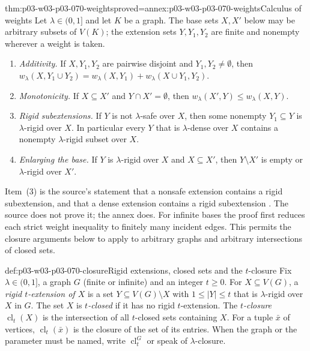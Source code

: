 \begin{hblemma}{thm:p03-w03-p03-070-weights}{proved=annex:p03-w03-p03-070-weights}{Calculus of weights}
Let \(\lambda\in(0,1]\) and let \(K\) be a graph.  The base sets \(X,X'\)
below may be arbitrary subsets of \(V(K)\); the extension sets
\(Y,Y_1,Y_2\) are finite and nonempty wherever a weight is taken.
\begin{enumerate}
\item \emph{Additivity.}  If \(X,Y_1,Y_2\) are pairwise disjoint and
      \(Y_1,Y_2\neq\emptyset\), then
      \(w_\lambda(X,Y_1\cup Y_2)=w_\lambda(X,Y_1)+w_\lambda(X\cup Y_1,Y_2)\).
\item \emph{Monotonicity.}  If \(X\subseteq X'\) and \(Y\cap X'=\emptyset\),
      then \(w_\lambda(X',Y)\leq w_\lambda(X,Y)\).
\item \emph{Rigid subextensions.}  If \(Y\) is not \(\lambda\)-safe over
      \(X\), then some nonempty \(Y_1\subseteq Y\) is \(\lambda\)-rigid over
      \(X\).  In particular every \(Y\) that is \(\lambda\)-dense over \(X\)
      contains a nonempty \(\lambda\)-rigid subset over \(X\).
\item \emph{Enlarging the base.}  If \(Y\) is \(\lambda\)-rigid over \(X\) and
      \(X\subseteq X'\), then \(Y\setminus X'\) is empty or
      \(\lambda\)-rigid over \(X'\).
\end{enumerate}
\end{hblemma}

Item~(3) is the source's statement that a nonsafe extension contains a rigid
subextension, and that a dense extension contains a rigid subextension
\cite[pp.~12 and 21]{Spencer2007LogicRandomStructuresAuthor}.  The source
does not prove it; the annex does.  For infinite bases the proof first
reduces each strict weight inequality to finitely many incident edges.
This permits the closure arguments below to apply to arbitrary graphs and
arbitrary intersections of closed sets.

\begin{hbdefinition}{def:p03-w03-p03-070-closure}{Rigid extensions, closed sets and the \(t\)-closure}
Fix \(\lambda\in(0,1]\), a graph \(G\) (finite or infinite) and an integer
\(t\geq0\).  For \(X\subseteq V(G)\), a \emph{rigid \(t\)-extension of
\(X\)} is a set \(Y\subseteq V(G)\setminus X\) with \(1\leq|Y|\leq t\) that
is \(\lambda\)-rigid over \(X\) in \(G\).  The set \(X\) is
\emph{\(t\)-closed} if it has no rigid \(t\)-extension.  The
\emph{\(t\)-closure} \(\operatorname{cl}_t(X)\) is the intersection of all
\(t\)-closed sets containing \(X\).  For a tuple \(\bar x\) of vertices,
\(\operatorname{cl}_t(\bar x)\) is the closure of the set of its entries.
When the graph or the parameter must be named, write
\(\operatorname{cl}^G_t\) or speak of \(\lambda\)-closure.
\end{hbdefinition}

